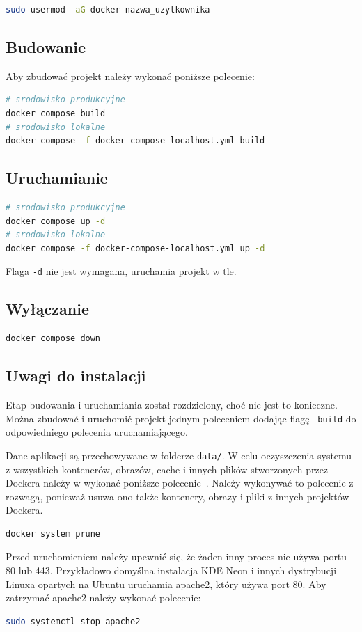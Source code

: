\documentclass[shortabstract]{iithesis}
\begin{document}
\begin{lstlisting}[language=bash]
sudo usermod -aG docker nazwa_uzytkownika
\end{lstlisting}

\subsection{Budowanie}
\noindent
Aby zbudować projekt należy wykonać poniższe polecenie:

\begin{lstlisting}[language=bash]
# srodowisko produkcyjne
docker compose build
# srodowisko lokalne
docker compose -f docker-compose-localhost.yml build
\end{lstlisting}

\subsection{Uruchamianie}
\begin{lstlisting}[language=bash]
# srodowisko produkcyjne
docker compose up -d
# srodowisko lokalne
docker compose -f docker-compose-localhost.yml up -d
\end{lstlisting}
Flaga \texttt{-d} nie jest wymagana, uruchamia projekt w tle.

\subsection{Wyłączanie}
\begin{lstlisting}[language=bash]
docker compose down
\end{lstlisting}

\subsection{Uwagi do instalacji}
Etap budowania i uruchamiania został rozdzielony, choć nie jest to konieczne.
Można zbudować i uruchomić projekt jednym poleceniem dodając flagę \texttt{--build} do odpowiedniego polecenia uruchamiającego.

Dane aplikacji są przechowywane w folderze \texttt{data/}.
W celu oczyszczenia systemu z wszystkich kontenerów, obrazów, cache i innych plików stworzonych przez Dockera należy w wykonać poniższe polecenie~\cite{DockerPrune}.
Należy wykonywać to polecenie z rozwagą, ponieważ usuwa ono także kontenery, obrazy i pliki z innych projektów Dockera.
\begin{lstlisting}[language=bash]
docker system prune
\end{lstlisting}
Przed uruchomieniem należy upewnić się, że żaden inny proces nie używa portu 80 lub 443.
Przykładowo domyślna instalacja KDE Neon i innych dystrybucji Linuxa opartych na Ubuntu uruchamia apache2, który używa port 80.
Aby zatrzymać apache2 należy wykonać polecenie:
\begin{lstlisting}[language=bash]
sudo systemctl stop apache2
\end{lstlisting}
\end{document}
